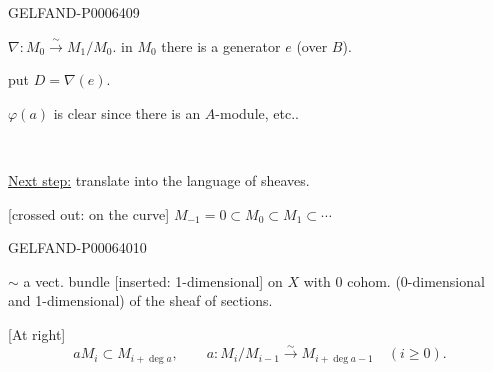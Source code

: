 \begin{GelfandAdjacentEvidence}{GELFAND-P000640}{9}

\(\nabla:M_0\overset{\sim}{\to}M_1/M_0\).
in \(M_0\) there is a generator \(e\) (over \(B\)).

put \(D=\nabla(e)\).

\(\varphi(a)\) is clear since there is an \(A\)-module, etc..

\begin{center}\textemdash\,\textperiodcentered\,\textemdash\end{center}

\underline{Next step:} translate into the language of sheaves.

[crossed out: on the curve] \(M_{-1}=0\subset M_0\subset M_1\subset\cdots\)
\end{GelfandAdjacentEvidence}
\begin{GelfandAdjacentEvidence}{GELFAND-P000640}{10}


\(\sim\) a vect. bundle [inserted: 1-dimensional] on \(X\)
with \(0\) cohom. (0-dimensional and 1-dimensional) of the sheaf of sections.

[At right]
\[
aM_i\subset M_{i+\operatorname{deg}a},\qquad
a:M_i/M_{i-1}\overset{\sim}{\to}M_{i+\operatorname{deg}a-1}
\quad(i\geqslant0).
\]
\end{GelfandAdjacentEvidence}



